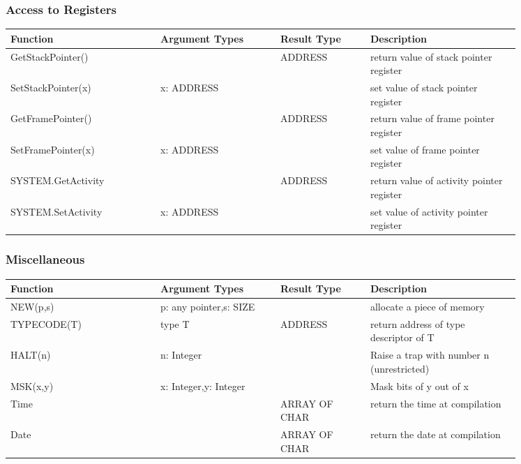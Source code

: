 \documentclass[a4wide,11pt]{article}
\begin{document}
\subsubsection{Access to Registers}
\begin{longtable}{|p{0.25\linewidth}|p{0.2\linewidth}|p{0.15\linewidth}|p{0.25\linewidth}|}

\hline
Function & Argument Types & Result Type & Description \\
\hline\hline
\endhead
GetStackPointer() & & ADDRESS & return value of stack pointer register \\
SetStackPointer(x) &x: ADDRESS &  & set value of stack pointer register \\
GetFramePointer() & & ADDRESS & return value of frame pointer register \\
SetFramePointer(x) &x: ADDRESS &  & set value of frame pointer register \\
SYSTEM.GetActivity & & ADDRESS & return value of activity pointer register \\
SYSTEM.SetActivity & x: ADDRESS &  & set value of activity pointer register \\
\hline \end{longtable}

\subsubsection{Miscellaneous}
\begin{longtable}{|p{0.25\linewidth}|p{0.2\linewidth}|p{0.15\linewidth}|p{0.25\linewidth}|}
\hline
Function & Argument Types & Result Type & Description \\
\hline\hline
NEW(p,s) & p: any pointer,\newline s: SIZE & & allocate a piece of memory \\
TYPECODE(T) & type T & ADDRESS & return address of type descriptor of T \\
HALT(n) & n: Integer & & Raise a trap with number n (unrestricted) \\
MSK(x,y) & x: Integer,\newline y: Integer & & Mask bits of y out of x \\
Time & & ARRAY OF CHAR & return the time at compilation \\
Date & & ARRAY OF CHAR & return the date at compilation \\
\hline
\end{longtable}
\end{document}
